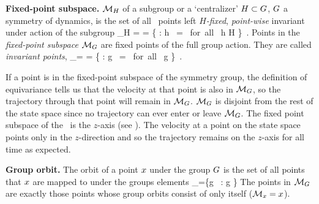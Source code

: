 {%
\begin{definition}
\label{def:centralizer}
\textbf{Fixed-point subspace.}
${\cal M}_H$ of a subgroup or a `centralizer' $H \subset G$,
$G$ a symmetry of dynamics, is the set of all \statesp\
points left \emph{$H$-fixed}, \emph{point-wise} invariant
under action of the subgroup
\beq
\pS_H =  =
   \{ \ssp \in \pS : {h} \, \ssp = \ssp \mbox{ for all } h \in H \}
\,.
Points in the \emph{fixed-point subspace}  $\pS_\Group$ are fixed
points of the full group action. They are called \emph{invariant
points},
\beq
\pS_\Group = \Fix{\Group} =
   \{ \ssp \in \pS : {g} \, \ssp = \ssp \mbox{ for all } g \in \Group \}
\,.
\end{definition}

If a point is in the fixed-point subspace of the symmetry group, the definition of equivariance  tells us that the velocity at that point is also in $\pS_\Group$, so the trajectory through that point will remain in $\pS_\Group$. $\pS_\Group$ is disjoint from the rest of the state space since no trajectory can ever enter or leave $\pS_\Group$. The fixed point subspace of the \cLe\ is the $z$-axis (see ). The velocity at a point on the state space points only in the $z$-direction and so the trajectory remains on the $z$-axis for all time as expected.

\begin{definition}
\label{def:grouporbit}
\textbf{Group orbit.}
The orbit of a point $\ssp$ under the group $\Group$ is the set of all points that $\ssp$ are mapped to under the groups elements
\beq
\pS_\ssp=\{{g} \, \ssp: g \in \Group\}
\eeq
The points in ${\cal M}_{G}$ are exactly those points whose group orbits consist of only itself (${\cal M}_{x}={x}$).
\end{definition}

}
